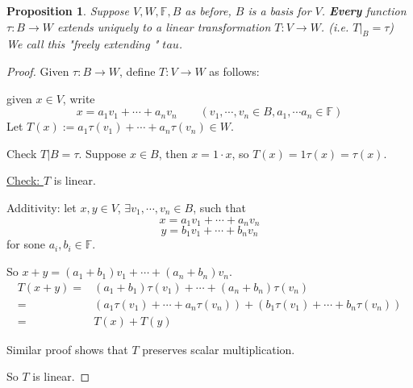 \documentclass[12pt]{article}
\newtheorem{proposition}{Proposition}[subsection]
\newcommand{\mF}{{\mathbb{F}}}
\begin{document}
	\begin{proposition}
		Suppose $V,W, \mF, B$ as before, $B$ is a basis for $V$. 
		\textbf{Every} function $\tau : B\to W$ extends uniquely to a linear 
		transformation $T: V \to W$. 
		(i.e. $T|_B = \tau$) We call this "freely extending " $tau$. 
	\end{proposition}
	\begin{proof}
		Given $\tau: B \to W$, define $T:V \to W$ as follows: 
		
		given $x \in V$, write 
		\[
			x = a_1v_1+\cdots+a_nv_n \qquad (v_1,\cdots, v_n \in B, a_1,\cdots
			a_n \in \mF)
		\]
		Let $T(x):= a_1\tau(v_1) + \cdots + a_n\tau(v_n) \in W$. 

		Check $T|B = \tau$. Suppose $x \in B$, then $x = 1\cdot x$, so 
		$T(x) = 1\tau (x) = \tau (x)$. 

		\underline{Check: } $T$ is linear. 
		\begin{description}
			\item Additivity: 
				let $x, y \in V$, $\exists v_1,\cdots,v_n\in B$,
				such that 
				\[
					x = a_1v_1 + \cdots + a_nv_n
				\]
				\[
					y = b_1v_1 + \cdots + b_nv_n
				\]
				for sone $a_i, b_i \in \mF$. 
				
				So $x + y = (a_1+b_1)v_1+\cdots + (a_n+b_n)v_n$. 
				\begin{align*}
					T(x+y)
					=&(a_1+b_1)\tau(v_1) + \cdots + (a_n + b_n)\tau(v_n)
					\tag{def of T}\\
					=&(a_1\tau(v_1)+\cdots+a_n\tau(v_n)) + 
					(b_1\tau(v_1)+\cdots+b_n\tau(v_n))\\
					=& T(x) + T(y) \tag{def of T}
				\end{align*}
			\item Similar proof shows that $T$ preserves scalar multiplication. 
		\end{description}
		So $T$ is linear. 
	\end{proof}
\end{document}
